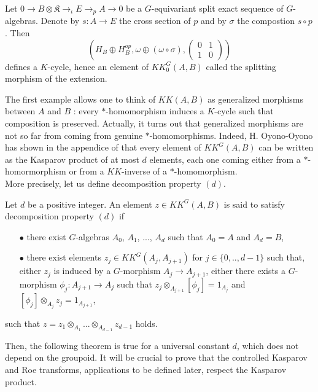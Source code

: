 \begin{Expl} Let $0 \rightarrow B\otimes \mathfrak K \rightarrow_\iota E \rightarrow_p A \rightarrow 0 $ be a $G$-equivariant split exact sequence of $G$-algebras. Denote by $s : A \rightarrow E$ the cross section of $p$ and by $\sigma $ the compostion $s\circ p$. Then 
\[(H_B \oplus H_B^{op},\omega \oplus (\omega \circ \sigma ), \begin{pmatrix} 0 & 1 \\ 1 & 0\end{pmatrix} )\] 
defines a $K$-cycle, hence an element of $KK_0^G(A,B)$ called the splitting morphism of the extension. %
\end{Expl}

The first example allows one to think of $KK(A,B)$ as generalized morphisms between $A$ and $B$ : every $*$-homomorphism induces a $K$-cycle such that composition is preserved. Actually, it turns out that generalized morphisms are not so far from coming from genuine $*$-homomorphisms. Indeed, H. Oyono-Oyono has shown in the appendice of \cite{LaffOY} that every element of $KK^G(A,B)$ can be written as the Kasparov product of at most $d$ elements, each one coming either from a $*$-homormorphism or from a $KK$-inverse of a $*$-homomorphism.\\


More precisely, let us define decomposition property $(d)$.

\begin{definition}
Let $d$ be a positive integer. An element $z\in KK^G(A,B)$ is said to satisfy decomposition property $(d)$ if
\begin{itemize}
\item[$\bullet$] there exist $G$-algebras $A_0$, $A_1$, ..., $A_d$ such that $A_0=A$ and $A_d=B$, 
\item[$\bullet$] there exist elements $z_j \in KK^G(A_{j},A_{j+1})$ for $j\in\{0,..,d-1\}$ such that, either $z_j$ is induced by a $G$-morphism $A_j \rightarrow A_{j+1}$, either there exists a $G$-morphism $\phi_j : A_{j+1}\rightarrow A_j$ such that $z_j \otimes_{A_{j+1}} [\phi_j] = 1_{A_j}$ and $ [\phi_j] \otimes_{A_{j}} z_j  = 1_{A_{j+1}}$,
\end{itemize}
such that $z = z_1 \otimes_{A_1}  ... \otimes_{A_{d-1}} z_{d-1} $ holds.
\end{definition}

Then, the following theorem is true for a universal constant $d$, which does not depend on the groupoid. It will be crucial to prove that the controlled Kasparov and Roe transforms, applications to be defined later, respect the Kasparov product. 

